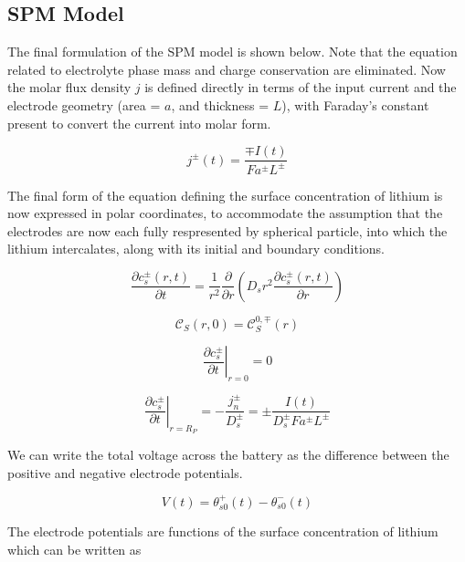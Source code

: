 \documentclass[lettersize,journal]{IEEEtran}
\begin{document}
\subsection{SPM Model}

The final formulation of the SPM model is shown below. Note that the equation related to electrolyte phase mass and charge conservation are eliminated. Now the molar flux density $j$ is defined directly in terms of the input current and the electrode geometry (area = $a$, and thickness = $L$), with Faraday's constant present to convert the current into molar form.


\begin{equation}
j^{\pm}(t)=\frac{\mp I(t)}{F a^{\pm} L^{\pm}}
\end{equation}


\noindent The final form of the equation defining the surface concentration of lithium is now expressed in polar coordinates, to accommodate the assumption that the electrodes are now each fully respresented by spherical particle, into which the lithium intercalates, along with its initial and boundary conditions.


\begin{equation}
\frac{\partial c_{s}^{\pm}(r, t)}{\partial t}=\frac{1}{r^{2}} \frac{\partial}{\partial r}\left(D_{s} r^{2} \frac{\partial c_{s}^{\pm}(r, t)}{\partial r}\right)
\end{equation}

\begin{equation}
\mathcal{C}_{S}(r, 0)=\mathcal{C}_{S}^{0, \mp}(r)
\end{equation}

\begin{equation}
\left.\frac{\partial c_{s}^{\pm}}{\partial t}\right|_{r=0}=0
\end{equation}

\begin{equation}
\left.\frac{\partial c_{s}^{\pm}}{\partial t}\right|_{r=R_{P}}=-\frac{j_{n}^{\pm}}{D_{s}^{\pm}}=\pm \frac{I(t)}{D_{s}^{\pm} F a^{\pm} L^{\pm}}
\end{equation}

\noindent We can write the total voltage across the battery as the difference between the positive and negative electrode potentials.


\begin{equation}
V(t)=\theta_{s 0}^{+}(t)-\theta_{s 0}^{-}(t)
\end{equation}

\noindent The electrode potentials are functions of the surface concentration of lithium which can be written as
\end{document}
